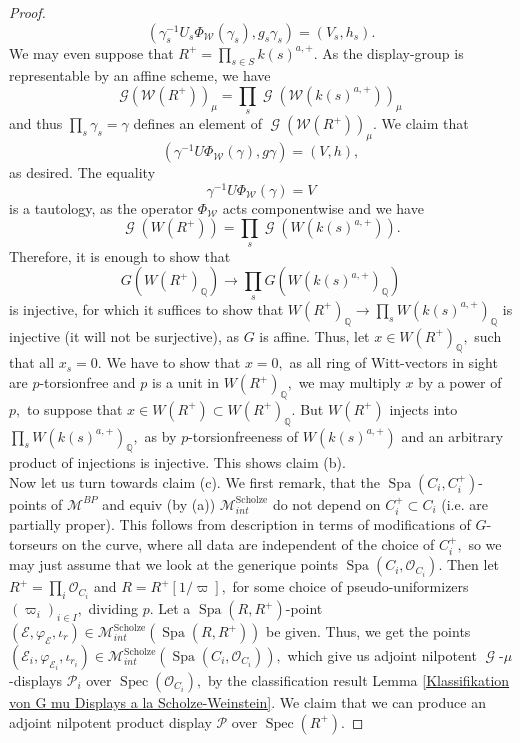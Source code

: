 \documentclass[a4paper,10,5 pt]{amsart}
\theoremstyle{definition}
\DeclareMathOperator{\Spec}{Spec}
\DeclareMathOperator{\Spa}{Spa}
\DeclareMathOperator{\G}{\mathcal{G}}
\begin{document}
\begin{proof}
\begin{equation}
(\gamma_{s}^{-1}U_{s}\Phi_{\mathcal{W}}(\gamma_{s}),g_{s}\gamma_{s})=(V_{s},h_{s}).
\end{equation}
We may even suppose that $R^{+}=\prod_{s\in S} k(s)^{a,+}.$ As the display-group is representable by an affine scheme, we have
$$
\mathcal{G}(\mathcal{W}(R^{+}))_{\mu}=\prod_{s}\G(\mathcal{W}(k(s)^{a,+}))_{\mu}
$$
and thus $\prod_{s}\gamma_{s}=\gamma$ defines an element of $\G(\mathcal{W}(R^{+}))_{\mu}.$ 
We claim that 
\begin{equation}
(\gamma^{-1}U\Phi_{\mathcal{W}}(\gamma),g\gamma)=(V,h),
\end{equation}
as desired. The equality
\begin{equation}
\gamma^{-1}U\Phi_{\mathcal{W}}(\gamma)=V
\end{equation} 
is a tautology, as the operator $\Phi_{\mathcal{W}}$ acts componentwise and we have
$$
\G(W(R^{+}))=\prod_{s} \G(W(k(s)^{a,+})).
$$ Therefore, it is enough to show that
$$
G(W(R^{+})_{\mathbb{Q}})\rightarrow \prod_{s}G(W(k(s)^{a,+})_{\mathbb{Q}})
$$
is injective, for which it suffices to show that $W(R^{+})_{\mathbb{Q}}\rightarrow \prod_{s}W(k(s)^{a,+})_{\mathbb{Q}}$ is injective (it will not be surjective), as $G$ is affine. Thus, let $x\in W(R^{+})_{\mathbb{Q}},$ such that all $x_{s}=0.$ We have to show that $x=0,$ as all ring of Witt-vectors in sight are $p$-torsionfree and $p$ is a unit in $W(R^{+})_{\mathbb{Q}},$ we may multiply $x$ by a power of $p,$ to suppose that $x\in W(R^{+})\subset W(R^{+})_{\mathbb{Q}}.$ But $W(R^{+})$ injects into $\prod_{s}W(k(s)^{a,+})_{\mathbb{Q}},$ as by $p$-torsionfreeness of $W(k(s)^{a,+})$ and an arbitrary product of injections is injective. This shows claim (b).
\\
Now let us turn towards claim (c). We first remark, that the $\Spa(C_{i},C_{i}^{+})$-points of $\mathcal{M}^{BP}$ and equiv (by (a)) $\mathcal{M}^{\text{Scholze}}_{int}$ do not depend on $C_{i}^{+}\subset C_{i}$ (i.e. are partially proper). This follows from description in terms of modifications of $G$-torseurs on the curve, where all data are independent of the choice of $C_{i}^{+},$ so we may just assume that we look at the generique points $\Spa(C_{i},\mathcal{O}_{C_{i}}).$ Then let $R^{+}=\prod_{i}\mathcal{O}_{C_{i}}$ and $R=R^{+}[1/\varpi],$ for some choice of pseudo-uniformizers $(\varpi_{i})_{i\in I},$ dividing $p.$ Let a $\Spa(R,R^{+})$-point $(\mathcal{E},\varphi_{\mathcal{E}},\iota_{r})\in \mathcal{M}^{\text{Scholze}}_{int}(\Spa(R,R^{+}))$ be given. Thus, we get the points $(\mathcal{E}_{i},\varphi_{\mathcal{E}_{i}},\iota_{r_{i}})\in \mathcal{M}^{\text{Scholze}}_{int}(\Spa(C_{i},\mathcal{O}_{C_{i}})),$ which give us adjoint nilpotent $\G$-$\mu$-displays $\mathcal{P}_{i}$ over $\Spec(\mathcal{O}_{C_{i}}),$ by the classification result Lemma \ref{Klassifikation von G mu Displays a la Scholze-Weinstein}. We claim that we can produce an adjoint nilpotent product display $\mathcal{P}$ over $\Spec(R^{+}).$

\end{proof}
\end{document}
